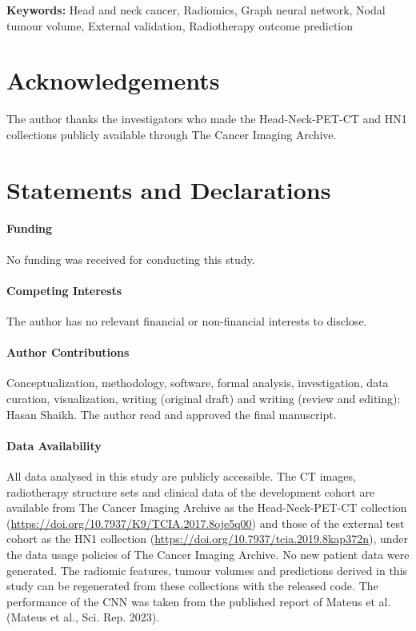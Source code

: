 \documentclass[11pt,a4paper]{article}
\begin{document}
\textbf{Keywords:} Head and neck cancer, Radiomics, Graph neural network, Nodal tumour volume, External validation, Radiotherapy outcome prediction

\section*{Acknowledgements}
The author thanks the investigators who made the Head-Neck-PET-CT and HN1 collections publicly available through The Cancer Imaging Archive.

\section*{Statements and Declarations}

\paragraph{Funding}
No funding was received for conducting this study.

\paragraph{Competing Interests}
The author has no relevant financial or non-financial interests to disclose.

\paragraph{Author Contributions}
Conceptualization, methodology, software, formal analysis, investigation, data curation, visualization, writing (original draft) and writing (review and editing): Hasan Shaikh. The author read and approved the final manuscript.

\paragraph{Data Availability}
All data analysed in this study are publicly accessible. The CT images, radiotherapy structure sets and clinical data of the development cohort are available from The Cancer Imaging Archive as the Head-Neck-PET-CT collection (\url{https://doi.org/10.7937/K9/TCIA.2017.8oje5q00}) and those of the external test cohort as the HN1 collection (\url{https://doi.org/10.7937/tcia.2019.8kap372n}), under the data usage policies of The Cancer Imaging Archive. No new patient data were generated. The radiomic features, tumour volumes and predictions derived in this study can be regenerated from these collections with the released code. The performance of the CNN was taken from the published report of Mateus et al. (Mateus et al., Sci. Rep. 2023).
\end{document}
